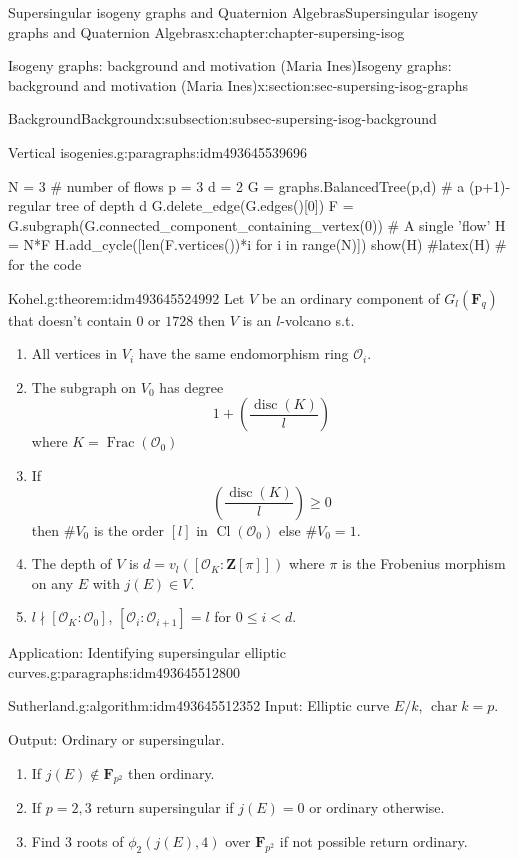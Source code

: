 \documentclass[oneside,10pt,]{book}
\numberwithin{equation}{section}
\newcommand{\lb}{[}
\newcommand{\rb}{]}
\newcommand{\ZZ}{\mathbf{Z}}
\newcommand{\FF}{\mathbf{F}}
\newcommand{\ints}{\mathcal{O}}
\DeclareMathOperator{\Cl}{Cl}
\DeclareMathOperator{\disc}{disc}
\DeclareMathOperator{\characteristic}{char}
\DeclareMathOperator{\Frac}{Frac}
\newcommand{\lt}{<}
\begin{document}
\begin{chapterptx}{Supersingular isogeny graphs and Quaternion Algebras}{}{Supersingular isogeny graphs and Quaternion Algebras}{}{}{x:chapter:chapter-supersing-isog}
\begin{sectionptx}{Isogeny graphs: background and motivation (Maria Ines)}{}{Isogeny graphs: background and motivation (Maria Ines)}{}{}{x:section:sec-supersing-isog-graphs}
\begin{subsectionptx}{Background}{}{Background}{}{}{x:subsection:subsec-supersing-isog-background}
\begin{paragraphs}{Vertical isogenies.}{g:paragraphs:idm493645539696}
\begin{sageinput}
N = 3 # number of flows
p = 3
d = 2
G = graphs.BalancedTree(p,d) # a (p+1)-regular tree of depth d
G.delete_edge(G.edges()[0])
F = G.subgraph(G.connected_component_containing_vertex(0)) # A single 'flow'
H = N*F
H.add_cycle([len(F.vertices())*i for i in range(N)])
show(H)
#latex(H) # for the code
\end{sageinput}
\begin{theorem}{Kohel.}{}{g:theorem:idm493645524992}%
Let \(V\) be an ordinary component of \(G_l(\FF_q)\) that doesn't contain \(0\) or \(1728\) then \(V\) is an \(l\)-volcano s.t.%
\begin{enumerate}
\item{}All vertices in \(V_i\) have the same endomorphism ring \(\ints_i\).%
\item{}The subgraph on \(V_0\) has degree%
\begin{equation*}
1+ \left(\frac {\disc(K)}{l}\right)
\end{equation*}
where \(K = \Frac(\ints_0)\)%
\item{}If%
\begin{equation*}
\left(\frac {\disc(K)}{l}\right) \ge 0
\end{equation*}
then \(\#V_0\) is the order \(\lb l \rb\) in \(\Cl (\ints_0)\) else \(\#V_0 = 1\).%
\item{}The depth of \(V\) is \(d = v_l (\lb \ints_K : \ZZ\lb\pi \rb\rb)\) where \(\pi\) is the Frobenius morphism on any \(E\) with \(j(E) \in V\).%
\item{}\(l \nmid \lb \ints_K : \ints_0 \rb\), \(\lb \ints_i : \ints_{i+1}\rb = l\) for \(0\le i \lt d\).%
\end{enumerate}
%
\end{theorem}
\end{paragraphs}%
\begin{paragraphs}{Application: Identifying supersingular elliptic curves.}{g:paragraphs:idm493645512800}%
\begin{algorithm}{Sutherland.}{}{g:algorithm:idm493645512352}%
Input: Elliptic curve \(E/k\), \(\characteristic k = p\).%
\par
Output: Ordinary or supersingular.%
\par
%
\begin{enumerate}
\item{}If \(j(E) \not \in \FF_{p^2}\) then ordinary.%
\item{}If \(p  =2,3\) return supersingular if \(j(E) = 0\) or ordinary otherwise.%
\item{}Find 3 roots of \(\phi_2(j(E), 4)\) over \(\FF_{p^2}\) if not possible return ordinary.%

\end{enumerate}
\end{algorithm}
\end{paragraphs}
\end{subsectionptx}
\end{sectionptx}
\end{chapterptx}
\end{document}
